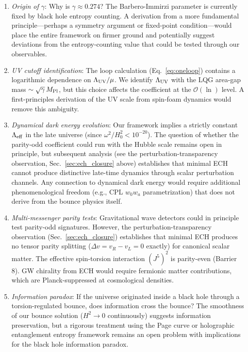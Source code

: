 \documentclass[aps,prd,twocolumn,superscriptaddress,showpacs,preprintnumbers,nofootinbib,longbibliography,floatfix]{revtex4-2}
\newcommand{\Leff}{\Lambda_{\rm eff}}
\newcommand{\MPl}{M_{\rm Pl}}
\begin{document}
\begin{enumerate}[leftmargin=*]
\item \textit{Origin of $\gamma$}: Why is $\gamma \approx 0.274$? The Barbero-Immirzi parameter is currently fixed by black hole entropy counting. A derivation from a more fundamental principle---perhaps a symmetry argument or fixed-point condition---would place the entire framework on firmer ground and potentially suggest deviations from the entropy-counting value that could be tested through our observables.

\item \textit{UV cutoff identification}: The loop calculation (Eq.~\ref{eq:oneloop}) contains a logarithmic dependence on $\Lambda_{\rm UV}/\mu$. We identify $\Lambda_{\rm UV}$ with the LQG area-gap mass $\sim\sqrt{\gamma}\,\MPl$, but this choice affects the coefficient at the $\mathcal{O}(\ln)$ level. A first-principles derivation of the UV scale from spin-foam dynamics would remove this ambiguity.

\item \textit{Dynamical dark energy evolution}: Our framework implies a strictly constant $\Leff$ in the late universe (since $\omega^2/H_0^2 < 10^{-20}$). The question of whether the parity-odd coefficient could run with the Hubble scale remains open in principle, but subsequent analysis (see the perturbation-transparency observation, Sec.~\ref{sec:ech_closure} above) establishes that minimal ECH cannot produce distinctive late-time dynamics through scalar perturbation channels. Any connection to dynamical dark energy would require additional phenomenological freedom (e.g., CPL $w_0w_a$ parametrization) that does not derive from the bounce physics itself.

\item \textit{Multi-messenger parity tests}: Gravitational wave detectors could in principle test parity-odd signatures. However, the perturbation-transparency observation (Sec.~\ref{sec:ech_closure}) establishes that minimal ECH produces no tensor parity splitting ($\Delta v = v_R - v_L = 0$ exactly) for canonical scalar matter. The effective spin-torsion interaction $(J^5)^2$ is parity-even (Barrier 8). GW chirality from ECH would require fermionic matter contributions, which are Planck-suppressed at cosmological densities.

\item \textit{Information paradox}: If the universe originated inside a black hole through a torsion-regulated bounce, does information cross the bounce? The smoothness of our bounce solution ($H^2 \to 0$ continuously) suggests information preservation, but a rigorous treatment using the Page curve or holographic entanglement entropy framework remains an open problem with implications for the black hole information paradox.


\end{enumerate}
\end{document}
